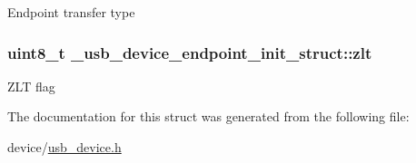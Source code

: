 Endpoint transfer type \hypertarget{struct__usb__device__endpoint__init__struct_afdac990e52df83bbd619e092039b13fd}{
\subsubsection[{zlt}]{\setlength{\rightskip}{0pt plus 5cm}uint8\-\_\-t \-\_\-usb\-\_\-device\-\_\-endpoint\-\_\-init\-\_\-struct\-::zlt}}\label{struct__usb__device__endpoint__init__struct_afdac990e52df83bbd619e092039b13fd}
Z\-L\-T flag 

The documentation for this struct was generated from the following file\-:\begin{DoxyCompactItemize}
\item 
device/\hyperlink{usb__device_8h}{usb\-\_\-device.\-h}\end{DoxyCompactItemize}
